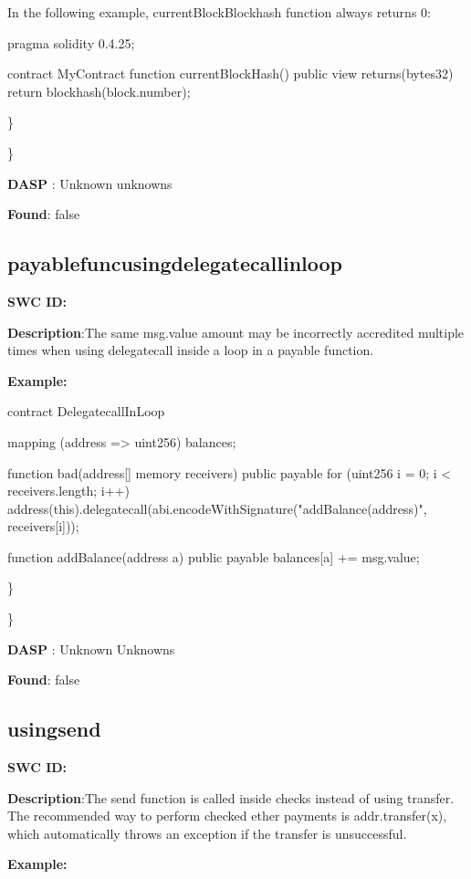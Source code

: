 \documentclass{article}
\begin{document}
{{In the following example, currentBlockBlockhash function always returns 0:

pragma solidity 0.4.25;

contract MyContract {
    function currentBlockHash() public view returns(bytes32) {
        return blockhash(block.number);
    }
}

\} 

\} 

\textbf{DASP} : Unknown unknowns

\textbf{Found}: false

\subsection{payable\textunderscore func\textunderscore using\textunderscore delegatecall\textunderscore in\textunderscore loop} 
\textbf{SWC \textunderscore ID:} 

\textbf{Description}:The same msg.value amount may be incorrectly accredited multiple times when using delegatecall inside a loop in a payable function.


\textbf{Example:} 

contract DelegatecallInLoop{

    mapping (address => uint256) balances;

    function bad(address[] memory receivers) public payable {
        for (uint256 i = 0; i < receivers.length; i++) {
            address(this).delegatecall(abi.encodeWithSignature("addBalance(address)", receivers[i]));
        }
    }

    function addBalance(address a) public payable {
        balances[a] += msg.value;
    }
}

\} 

\} 

\textbf{DASP} : Unknown Unknowns

\textbf{Found}: false

\subsection{using\textunderscore send} 
\textbf{SWC \textunderscore ID:} 

\textbf{Description}:The send function is called inside checks instead of using transfer. The recommended way to perform checked ether payments is addr.transfer(x), which automatically throws an exception if the transfer is unsuccessful.


\textbf{Example:} 

}}
\end{document}
